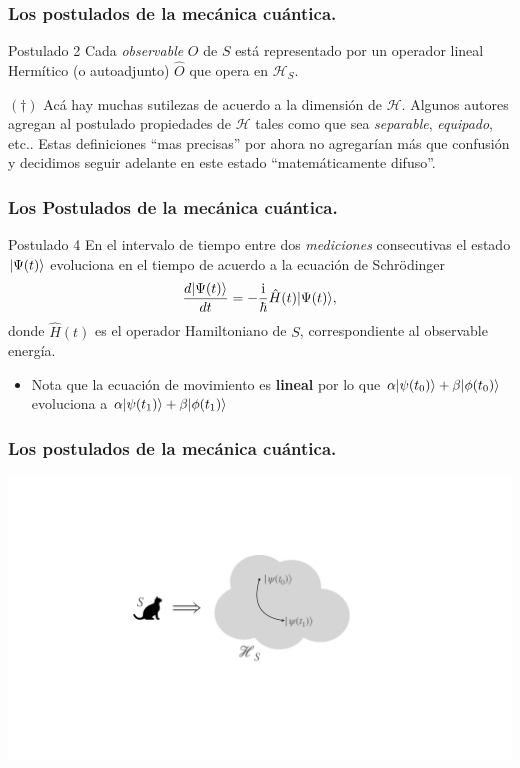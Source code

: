 \documentclass{beamer}
\begin{document}
\begin{frame}
    \frametitle{Los postulados de la mecánica cuántica.}

    \begin{block}{Postulado 2}
        Cada {\em observable} $O$ de $S$ está representado por un operador lineal Hermítico (o autoadjunto) $\hat{O}$ que opera en $\mathcal{H}_S$.
    \end{block}

    $(\dagger)$ Acá hay muchas sutilezas de acuerdo a la dimensión de $\mathcal{H}$. Algunos autores agregan al postulado propiedades de $\mathcal{H}$ tales como que sea {\em separable}, {\em equipado}, etc.. Estas definiciones ``mas precisas'' por ahora no agregarían más que confusión y decidimos seguir adelante en este estado ``matemáticamente difuso''. 

\end{frame} 

\begin{frame}
    \frametitle{Los Postulados de la mecánica cuántica.}
    
    \begin{block}{Postulado 4}
        En el intervalo de tiempo entre dos {\em mediciones} consecutivas el estado $| \Psi(t) \rangle$ evoluciona en el tiempo de acuerdo a la ecuación de Schrödinger
        \[\frac{d| \Psi(t) \rangle}{dt} = -\frac{\mathrm{i}}{\hbar} \hat{H}(t)| \Psi(t) \rangle,\]
        donde $\hat{H}(t)$ es el operador Hamiltoniano de $S$, correspondiente al observable energía.
    \end{block}
    \begin{itemize}
        \item Nota que la ecuación de movimiento es {\bf lineal} por lo que $\alpha| \psi(t_0) \rangle+\beta| \phi(t_0) \rangle$ evoluciona a $\alpha| \psi(t_1) \rangle+\beta| \phi(t_1) \rangle$
    \end{itemize}
\end{frame}

\begin{frame}
    \frametitle{Los postulados de la mecánica cuántica.}
    \begin{center}
        \includegraphics[scale=0.3]{figs/cats_06.pdf}
    \end{center}

\end{frame}
\end{document}
